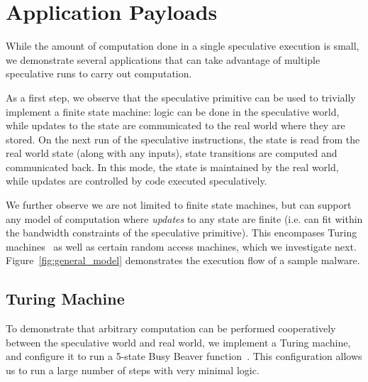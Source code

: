 
\section{Application Payloads}

While the amount of computation done in a single speculative execution is small,
we demonstrate several applications that can take advantage of multiple
speculative runs to carry out computation.

As a first step, we observe that the speculative primitive can be used to trivially
implement a finite state machine: logic can be done in the speculative
world, while updates to the state are communicated to the real world where they
are stored. On the next run of the speculative instructions, the state is read from the
real world state (along with any inputs), state transitions are computed and communicated back.
In this mode, the state is maintained by the real world,
while updates are controlled by code executed speculatively.

We further observe we are not limited to finite state machines, but can support
any model of computation where \emph{updates} to any state are finite (i.e. can fit
within the bandwidth constraints of the speculative primitive). This
encompases Turing machines~\cite{turing1937computable} as well as certain random access machines, which we
investigate next.
Figure~\ref{fig:general_model} demonstrates the execution flow of a sample \speculake malware.


\FigGeneralModel

\subsection{Turing Machine}
\label{subsec:turing}
To demonstrate that arbitrary computation can be performed cooperatively between
the speculative world and real world,
we implement a Turing machine, and configure it to run a 5-state Busy Beaver 
function~\cite{turing1937computable,chaitin1987computing,herken1992universal}. This configuration allows
us to run a large number of steps with very minimal logic.

